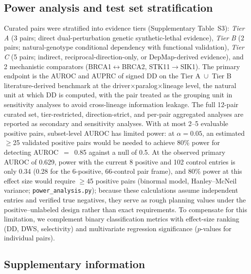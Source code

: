 \documentclass[11pt,a4paper]{article}
\begin{document}
\subsection*{Power analysis and test set stratification}

Curated pairs were stratified into evidence tiers (Supplementary Table~S3): \textit{Tier A} (3 pairs; direct dual-perturbation genetic synthetic-lethal evidence), \textit{Tier B} (2 pairs; natural-genotype conditional dependency with functional validation), \textit{Tier C} (5 pairs; indirect, reciprocal-direction-only, or DepMap-derived evidence), and 2 mechanistic comparators (BRCA1$\leftrightarrow$BRCA2, STK11$\rightarrow$SIK1). The primary endpoint is the AUROC and AUPRC of signed DD on the Tier A~$\cup$~Tier B literature-derived benchmark at the driver$\times$paralog$\times$lineage level, the natural unit at which DD is computed, with the pair treated as the grouping unit in sensitivity analyses to avoid cross-lineage information leakage. The full 12-pair curated set, tier-restricted, direction-strict, and per-pair aggregated analyses are reported as secondary and sensitivity analyses. With at most 2--5 evaluable positive pairs, subset-level AUROC has limited power: at $\alpha=0.05$, an estimated $\ge$25 validated positive pairs would be needed to achieve 80\% power for detecting AUROC~$=$~0.85 against a null of 0.5. At the observed primary AUROC of 0.629, power with the current 8 positive and 102 control entries is only 0.34 (0.28 for the 6-positive, 66-control pair frame), and 80\% power at this effect size would require $\ge$45 positive pairs (binormal model, Hanley--McNeil variance; \texttt{power\_analysis.py}); because these calculations assume independent entries and verified true negatives, they serve as rough planning values under the positive--unlabeled design rather than exact requirements. To compensate for this limitation, we complement binary classification metrics with effect-size ranking (DD, DWS, selectivity) and multivariate regression significance ($p$-values for individual pairs).

\subsection*{Supplementary information}
\end{document}
